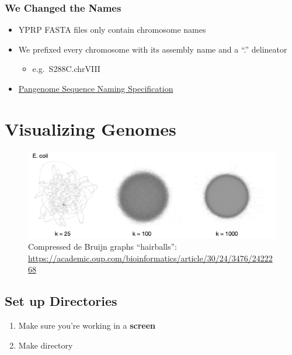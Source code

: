 \documentclass[
]{book}
\providecommand{\tightlist}{%
  \setlength{\itemsep}{0pt}\setlength{\parskip}{0pt}}
\begin{document}
\hypertarget{we-changed-the-names}{%
\subsection{We Changed the Names}\label{we-changed-the-names}}

\begin{itemize}
\tightlist
\item
  YPRP FASTA files only contain chromosome names
\item
  We prefixed every chromosome with its assembly name and a ``.'' delineator

  \begin{itemize}
  \tightlist
  \item
    e.g.~S288C.chrVIII
  \end{itemize}
\item
  \href{https://github.com/pangenome/PanSN-spec}{Pangenome Sequence Naming Specification}
\end{itemize}

\hypertarget{visualizing-genomes}{%
\chapter{Visualizing Genomes}\label{visualizing-genomes}}

\begin{figure}
\centering
\includegraphics[width=1\textwidth,height=\textheight]{./Figures/hairballsB.png}
\caption{Compressed de Bruijn graphs ``hairballs'': \url{https://academic.oup.com/bioinformatics/article/30/24/3476/2422268}}
\end{figure}

\hypertarget{set-up-directories}{%
\section{Set up Directories}\label{set-up-directories}}

\begin{enumerate}
\def\labelenumi{\arabic{enumi}.}
\item
  Make sure you're working in a \textbf{screen}
\item
  Make directory
\end{enumerate}
\end{document}
